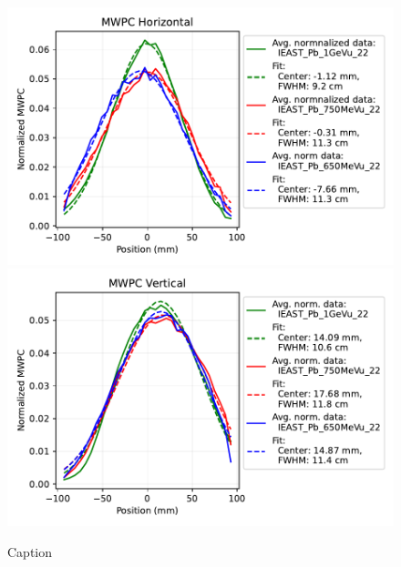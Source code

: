     \begin{figure}[!htb]
        \centering
        \includegraphics[width=0.48\columnwidth]{images/MWPC/MWPC_horizontal.pdf}
        \includegraphics[width=0.48\columnwidth]{images/MWPC/MWPC_vertical.pdf}
        \caption{Caption}
        \label{fig:my_label}
    \end{figure}
    